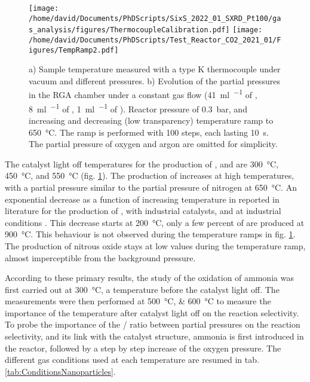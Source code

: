 \begin{figure}[!htb]
    \centering
    \texttt{[image: /home/david/Documents/PhDScripts/SixS\_2022\_01\_SXRD\_Pt100/gas\_analysis/figures/ThermocoupleCalibration.pdf]}
    \texttt{[image: /home/david/Documents/PhDScripts/Test\_Reactor\_CO2\_2021\_01/Figures/TempRamp2.pdf]}
    \caption{
        a) Sample temperature measured with a type K thermocouple under vacuum and different  pressures.
        b) Evolution of the partial pressures in the RGA chamber under a constant gas flow (\qty{41}{\ml\per\min} of , \qty{8}{\ml\per\min} of , \qty{1}{\ml\per\min} of ).
        Reactor pressure of \qty{0.3}{\bar}, and increasing and decreasing (low transparency) temperature ramp to \qty{650}{\degreeCelsius}.
        The ramp is performed with 100 steps, each lasting \qty{10}{\second}.
        The partial pressure of oxygen and argon are omitted for simplicity.
    }
    \label{fig:TempRamps}
\end{figure}

The catalyst light off temperatures for the production of ,  and  are \qty{300}{\degreeCelsius}, \qty{450}{\degreeCelsius}, and \qty{550}{\degreeCelsius} (fig. \ref{fig:TempRamps}).
The production of  increases at high temperatures, with a partial pressure similar to the partial pressure of nitrogen at \qty{650}{\degreeCelsius}.
An exponential decrease as a function of increasing temperature in reported in literature for the production of , with industrial catalysts, and at industrial conditions \parencite{Hatscher2008}.
This decrease starts at \qty{200}{\degreeCelsius}, only a few percent of  are produced at \qty{900}{\degreeCelsius}.
This behaviour is not observed during the temperature ramps in fig. \ref{fig:TempRamps}.
The production of nitrous oxide stays at low values during the temperature ramp, almost imperceptible from the background pressure.

According to these primary results, the study of the oxidation of ammonia was first carried out at \qty{300}{\degreeCelsius}, a temperature before the catalyst light off.
The measurements were then performed at \qtylist{500; 600}{\degreeCelsius} to measure the importance of the temperature after catalyst light off on the reaction selectivity.
To probe the importance of the / ratio between partial pressures on the reaction selectivity, and its link with the catalyst structure, ammonia is first introduced in the reactor, followed by a step by step increase of the oxygen pressure.
The different gas conditions used at each temperature are resumed in tab. \ref{tab:ConditionsNanoparticles}.

